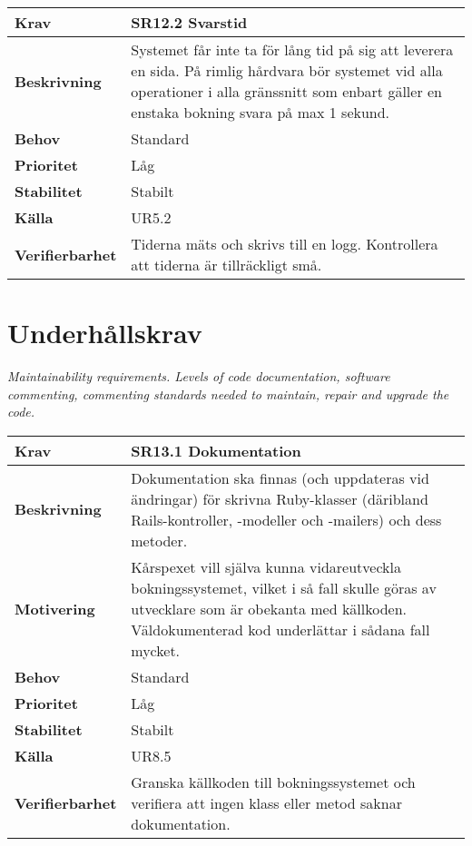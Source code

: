 \documentclass[a4paper, twoside, 11pt, titlepage]{article}
\begin{document}
\begin{tabular} { p{2.6cm} p{12.5cm} }
	\hline
	\sffamily\textbf{Krav} & SR12.2 Svarstid  \\
	\hline
	\sffamily\textbf{Beskrivning} & Systemet får inte ta för lång tid på sig att leverera en sida. På rimlig hårdvara bör systemet vid alla operationer i alla gränssnitt som enbart gäller en enstaka bokning svara på max 1 sekund.  \\
	\hline
	\sffamily\textbf{Behov} & Standard  \\
	\hline
	\sffamily\textbf{Prioritet} & Låg  \\
	\hline
	\sffamily\textbf{Stabilitet} & Stabilt  \\
	\hline
	\sffamily\textbf{Källa} & UR5.2  \\
	\hline
	\sffamily\textbf{Verifierbarhet} & Tiderna mäts och skrivs till en logg. Kontrollera att tiderna är tillräckligt små.  \\
	\hline
\end{tabular}


\clearpage
\section{Underhållskrav}


\emph{Maintainability requirements. Levels of code documentation, software commenting, commenting standards needed to maintain, repair and upgrade the code.}

\begin{tabular} { p{2.6cm} p{12.5cm} }
	\hline
	\sffamily\textbf{Krav} & \sffamily\textbf{SR13.1 Dokumentation } \\
	\hline
	\sffamily\textbf{Beskrivning} & Dokumentation ska finnas (och uppdateras vid ändringar) för skrivna Ruby-klasser (däribland Rails-kontroller, -modeller och -mailers) och dess metoder.  \\
	\hline
	\sffamily\textbf{Motivering} & Kårspexet vill själva kunna vidareutveckla bokningssystemet, vilket i så fall skulle göras av utvecklare som är obekanta med källkoden. Väldokumenterad kod underlättar i sådana fall mycket.  \\
	\hline
	\sffamily\textbf{Behov} & Standard  \\
	\hline
	\sffamily\textbf{Prioritet} & Låg  \\
	\hline
	\sffamily\textbf{Stabilitet} & Stabilt  \\
	\hline
	\sffamily\textbf{Källa} & UR8.5  \\
	\hline
	\sffamily\textbf{Verifierbarhet} & Granska källkoden till bokningssystemet och verifiera att ingen  klass eller metod saknar dokumentation.  \\
	\hline
\end{tabular}
\vspace{6mm}
\end{document}
